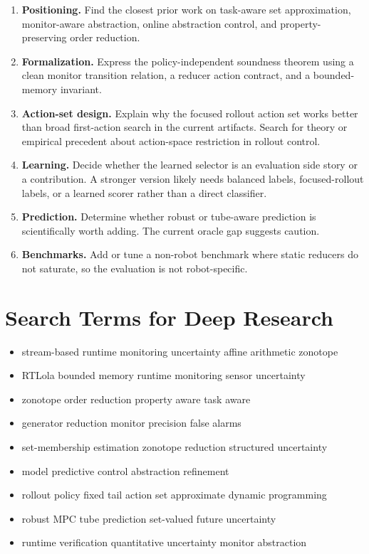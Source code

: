 \documentclass[11pt]{article}
\begin{document}
\begin{enumerate}
\item \textbf{Positioning.} Find the closest prior work on task-aware set
approximation, monitor-aware abstraction, online abstraction control, and
property-preserving order reduction.
\item \textbf{Formalization.} Express the policy-independent soundness theorem
using a clean monitor transition relation, a reducer action contract, and a
bounded-memory invariant.
\item \textbf{Action-set design.} Explain why the focused rollout action set
works better than broad first-action search in the current artifacts. Search
for theory or empirical precedent about action-space restriction in rollout
control.
\item \textbf{Learning.} Decide whether the learned selector is an evaluation
side story or a contribution. A stronger version likely needs balanced labels,
focused-rollout labels, or a learned scorer rather than a direct classifier.
\item \textbf{Prediction.} Determine whether robust or tube-aware prediction is
scientifically worth adding. The current oracle gap suggests caution.
\item \textbf{Benchmarks.} Add or tune a non-robot benchmark where static
reducers do not saturate, so the evaluation is not robot-specific.
\end{enumerate}

\section{Search Terms for Deep Research}

\begin{itemize}
\item stream-based runtime monitoring uncertainty affine arithmetic zonotope
\item RTLola bounded memory runtime monitoring sensor uncertainty
\item zonotope order reduction property aware task aware
\item generator reduction monitor precision false alarms
\item set-membership estimation zonotope reduction structured uncertainty
\item model predictive control abstraction refinement
\item rollout policy fixed tail action set approximate dynamic programming
\item robust MPC tube prediction set-valued future uncertainty
\item runtime verification quantitative uncertainty monitor abstraction
\end{itemize}
\end{document}
